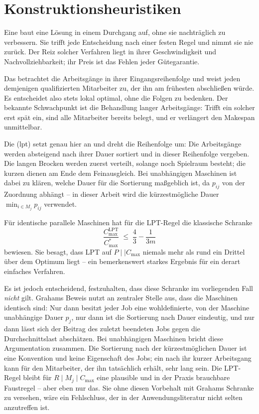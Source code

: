 \section{Konstruktionsheuristiken}
\label{sec:heuristiken}

Eine  baut eine Lösung in einem Durchgang auf,
ohne sie nachträglich zu verbessern. Sie trifft jede Entscheidung nach einer
festen Regel und nimmt sie nie zurück. Der Reiz solcher Verfahren liegt in ihrer
Geschwindigkeit und Nachvollziehbarkeit; ihr Preis ist das Fehlen jeder
Gütegarantie.

Das  betrachtet die Arbeitsgänge in
ihrer Eingangsreihenfolge und weist jeden demjenigen qualifizierten Mitarbeiter
zu, der ihn am frühesten abschließen würde. Es entscheidet also stets lokal
optimal, ohne die Folgen zu bedenken. Der bekannte Schwachpunkt ist die
Behandlung langer Arbeitsgänge: Trifft ein solcher erst spät ein, sind alle
Mitarbeiter bereits belegt, und er verlängert den Makespan unmittelbar.

Die  (\ac{lpt}) setzt genau hier an und dreht die Reihenfolge
um: Die Arbeitsgänge werden absteigend nach ihrer Dauer sortiert und in dieser
Reihenfolge vergeben. Die langen Brocken werden zuerst verteilt, solange noch
Spielraum besteht; die kurzen dienen am Ende dem Feinausgleich. Bei unabhängigen
Maschinen ist dabei zu klären, welche Dauer für die Sortierung maßgeblich ist,
da $p_{ij}$ von der Zuordnung abhängt -- in dieser Arbeit wird die kürzestmögliche
Dauer $\min_{i \in M_j} p_{ij}$ verwendet.

Für identische parallele Maschinen hat \textcite{graham1969bounds} für die
LPT-Regel die klassische Schranke
\begin{equation}
  \frac{C_{\max}^{\text{LPT}}}{C_{\max}^{*}} \;\le\; \frac{4}{3} - \frac{1}{3m}
  \label{eq:graham}
\end{equation}
bewiesen. Sie besagt, dass LPT auf $P \mid\mid C_{\max}$ niemals mehr als rund
ein Drittel über dem Optimum liegt -- ein bemerkenswert starkes Ergebnis für ein
derart einfaches Verfahren.

Es ist jedoch entscheidend, festzuhalten, dass diese Schranke im vorliegenden
Fall \emph{nicht} gilt. Grahams Beweis nutzt an zentraler Stelle aus, dass die
Maschinen identisch sind: Nur dann besitzt jeder Job eine wohldefinierte, von
der Maschine unabhängige Dauer $p_j$, nur dann ist die Sortierung nach Dauer
eindeutig, und nur dann lässt sich der Beitrag des zuletzt beendeten Jobs gegen
die Durchschnittslast abschätzen. Bei unabhängigen Maschinen bricht diese
Argumentation zusammen. Die Sortierung nach der kürzestmöglichen Dauer ist eine
Konvention und keine Eigenschaft des Jobs; ein nach ihr kurzer Arbeitsgang kann
für den Mitarbeiter, der ihn tatsächlich erhält, sehr lang sein. Die LPT-Regel
bleibt für $R \mid M_j \mid C_{\max}$ eine plausible und in der Praxis brauchbare
Faustregel -- aber eben nur das. Sie ohne diesen Vorbehalt mit Grahams Schranke
zu versehen, wäre ein Fehlschluss, der in der Anwendungsliteratur nicht selten
anzutreffen ist.

